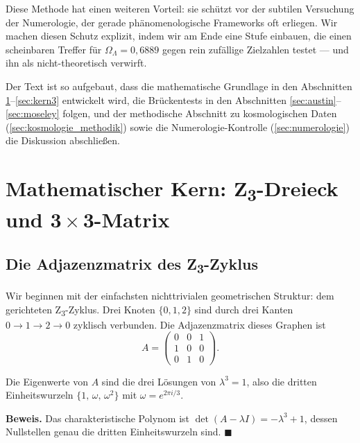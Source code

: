 Diese Methode hat einen weiteren Vorteil: sie schützt vor der subtilen Versuchung der Numerologie, der gerade phänomenologische Frameworks oft erliegen. Wir machen diesen Schutz explizit, indem wir am Ende eine Stufe einbauen, die einen scheinbaren Treffer für \(\Omega_\Lambda = 0{,}6889\) gegen rein zufällige Zielzahlen testet — und ihn als nicht-theoretisch verwirft.

Der Text ist so aufgebaut, dass die mathematische Grundlage in den Abschnitten \ref{sec:kern1}--\ref{sec:kern3} entwickelt wird, die Brückentests in den Abschnitten \ref{sec:austin}--\ref{sec:moseley} folgen, und der methodische Abschnitt zu kosmologischen Daten (\ref{sec:kosmologie_methodik}) sowie die Numerologie-Kontrolle (\ref{sec:numerologie}) die Diskussion abschließen.

\section{Mathematischer Kern: Z\textsubscript{3}-Dreieck und 3\texorpdfstring{\,\(\times\)\,}{ x }3-Matrix}
\label{sec:kern1}

\subsection{Die Adjazenzmatrix des Z\textsubscript{3}-Zyklus}

Wir beginnen mit der einfachsten nichttrivialen geometrischen Struktur: dem gerichteten Z\textsubscript{3}-Zyklus. Drei Knoten \(\{0, 1, 2\}\) sind durch drei Kanten \(0 \to 1 \to 2 \to 0\) zyklisch verbunden. Die Adjazenzmatrix dieses Graphen ist
\begin{equation}
A = \begin{pmatrix} 0 & 0 & 1 \\ 1 & 0 & 0 \\ 0 & 1 & 0 \end{pmatrix}.
\label{eq:A}
\end{equation}

\begin{foundation}
Die Eigenwerte von \(A\) sind die drei Lösungen von \(\lambda^3 = 1\), also die dritten Einheitswurzeln \(\{1,\, \omega,\, \omega^2\}\) mit \(\omega = e^{2\pi i / 3}\).
\end{foundation}

\noindent\textbf{Beweis.} Das charakteristische Polynom ist \(\det(A - \lambda I) = -\lambda^3 + 1\), dessen Nullstellen genau die dritten Einheitswurzeln sind. \(\blacksquare\)

